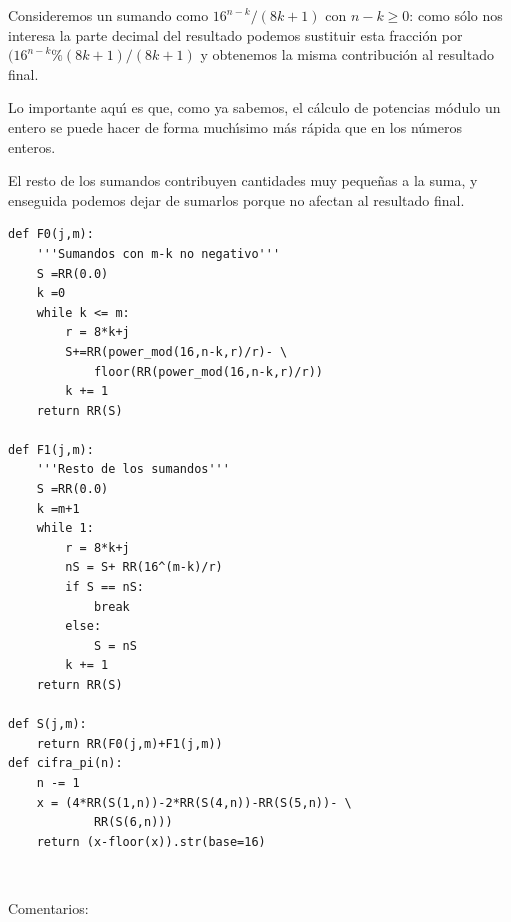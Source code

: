 \begin{enumerate}
Consideremos un sumando como $16^{n-k}/(8k+1)$ con $n-k\ge 0$: como s\'olo  nos
interesa la parte decimal del resultado podemos sustituir esta fracci\'on por 
 $(16^{n-k}\%(8k+1)/(8k+1)$ y obtenemos la misma contribuci\'on al resultado
final. 
 
 Lo importante aqu\'{\i} es que, como ya sabemos, el c\'alculo de potencias
m\'odulo 
 un entero se puede hacer de forma much\'{\i}simo m\'as r\'apida que en los
n\'umeros enteros.
 
 El resto de los sumandos contribuyen cantidades muy peque\~nas a la suma,  y
enseguida podemos dejar de sumarlos porque no afectan al resultado final.
 
 \end{enumerate}
 
 
 \begin{lstlisting}
def F0(j,m):
    '''Sumandos con m-k no negativo'''
    S =RR(0.0)
    k =0 
    while k <= m:
        r = 8*k+j
        S+=RR(power_mod(16,n-k,r)/r)- \
	        floor(RR(power_mod(16,n-k,r)/r))        
        k += 1
    return RR(S)  
 
def F1(j,m):
    '''Resto de los sumandos'''
    S =RR(0.0)
    k =m+1
    while 1:
        r = 8*k+j
        nS = S+ RR(16^(m-k)/r)
        if S == nS:
            break
        else:
            S = nS
        k += 1
    return RR(S)
    
def S(j,m):
    return RR(F0(j,m)+F1(j,m))
def cifra_pi(n):
    n -= 1
    x = (4*RR(S(1,n))-2*RR(S(4,n))-RR(S(5,n))- \
		    RR(S(6,n)))
    return (x-floor(x)).str(base=16)
\end{lstlisting}

\


{\sc Comentarios:}
 
